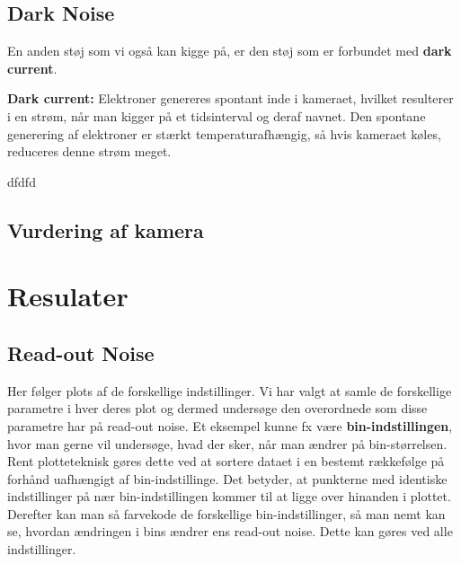 \documentclass[working]{tuftebook}
\begin{document}
\section{Dark Noise}
En anden støj som vi også kan kigge på, er den støj som er forbundet med \textbf{dark current}.
\begin{marginfigure}
\textbf{Dark current:} Elektroner genereres spontant inde i kameraet, hvilket resulterer i en strøm, når man kigger på et tidsinterval og deraf navnet. Den spontane generering af elektroner er stærkt temperaturafhængig, så hvis kameraet køles, reduceres denne strøm meget.
\end{marginfigure} 
dfdfd
\section{Vurdering af kamera}


\chapter{Resulater}
\section{Read-out Noise}
Her følger plots af de forskellige indstillinger. Vi har valgt at samle de forskellige parametre i hver deres plot og dermed undersøge den overordnede som disse parametre har på read-out noise.
Et eksempel kunne fx være \textbf{bin-indstillingen}, hvor man gerne vil undersøge, hvad der sker, når man ændrer på bin-størrelsen. Rent plotteteknisk gøres dette ved at sortere dataet i en bestemt rækkefølge på forhånd uafhængigt af bin-indstillinge. Det betyder, at punkterne med identiske indstillinger på nær bin-indstillingen kommer til at ligge over hinanden i plottet. Derefter kan man så farvekode de forskellige bin-indstillinger, så man nemt kan se, hvordan ændringen i bins ændrer ens read-out noise. Dette kan gøres ved alle indstillinger.
\end{document}
